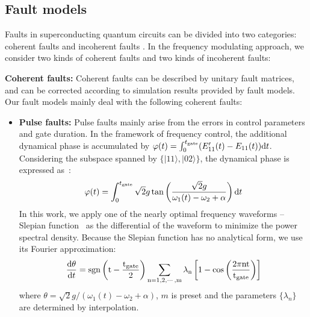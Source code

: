 \documentclass[conference, 9pt]{IEEEtran}
\begin{document}
\subsection{Fault models}

Faults in superconducting quantum circuits can be divided into two categories: coherent faults 
and incoherent faults %
. In  the frequency modulating approach, we consider two kinds of coherent faults and two kinds of incoherent faults: 

\textbf{Coherent faults:} Coherent faults can be described by unitary fault matrices, and can be corrected according to simulation results provided by fault models. Our fault models mainly deal with the following coherent faults: 
\begin{itemize}
    \item \textbf{Pulse faults:} 
        Pulse faults mainly arise from the errors in control parameters and gate duration. In  the framework of frequency control, the additional dynamical phase is accumulated by $\varphi(t) = \int_0^{t_{\rm{gate}}}( E_{11}'(t) - E_{11}(t)) \text{d}t$. 
        Considering the subspace spanned by $\{|11\rangle, |02\rangle\}$, the dynamical phase is expressed as~\cite{PhysRevApplied.11.034030}: 
      \begin{equation}
        \varphi(t) = \int_0^{t_{\rm{gate}}}\sqrt{2}g\tan\left(\frac{\sqrt{2}g}{\omega_1(t)- \omega_2+\alpha}\right)\text{d}t
        \end{equation}
    In this work, we apply one of the nearly optimal frequency waveforms -- Slepian function~\cite{Martinis_2014} as the differential of the waveform to minimize the power spectral density. Because the Slepian function has no analytical form, we use its Fourier approximation:
    \begin{equation}
      \frac{\text{d}\theta}{\text{d}t} = \rm{sgn}\left(t - \frac{t_{\rm{gate}}}{2}\right)\sum_{n = 1,2,\cdots,m}\lambda_n\left[1-\cos\left(\frac{2\pi nt}{t_{\rm{gate}}}\right)\right]
    \end{equation}
    where $\theta = \sqrt{2}g/(\omega_1(t)- \omega_2+\alpha)$, $m$ is preset and the parameters $\{\lambda_n\}$ are determined by interpolation.
    

\end{itemize}
\end{document}
